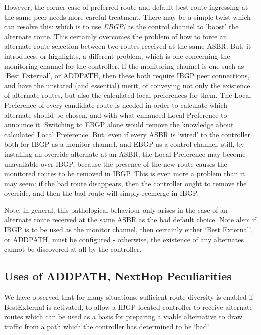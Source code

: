 However, the corner case of preferred route and default best route ingressing
at the same peer needs more careful treatment.
There may be a simple twist
which can resolve this: which is to use \emph{EBGP|} as the control channel to
'boost' the alternate route.
This certainly overcomes the problem of how to
force an alternate route selection between two routes received at the same
ASBR.
But, it introduces, or highlights, a different problem, which is one concerning the monitoring channel for the controller.
If the monitoring channel is one such as `Best External', or ADDPATH, then these both
require IBGP peer connections, and have the unstated (and essential) merit, of
conveying not only the existence of alternate routes, but also the calculated
local preferences for them.
The Local Preference of every candidate route is needed in order to calculate
which alternate should be chosen, and with what enhanced Local Preference to
announce it.  Switching to EBGP alone would remove the knowledge about
calculated Local Preference.  But, even if every ASBR is `wired' to the
controller both for IBGP as a monitor channel, and EBGP as a control channel,
still, by installing an override alternate at an ASBR, the Local Preference may
become unavailable over IBGP, because the presence of the new route causes the
monitored routes to be removed in IBGP.  This is even more a problem than it
may seem: if the bad route disappears, then the controller ought to remove the
override, and then the bad route will simply reemerge in IBGP.

Note: in general, this pathological behaviour only arises in the case of an alternate route received at
the same ASBR as the bad default choice.
Note also: if IBGP is to be used as the monitor channel, then certainly either `Best External', or ADDPATH, must be configured - otherwise, the existence of any alternates cannot be discovered at all by the controller.
\subsection{Uses of ADDPATH, NextHop Peculiarities}
We have  observed that for many situations, sufficient route diversity is enabled if BestExternal is activated, to allow a IBGP located controller to receive alternate routes which can be used as a basis for preparing a viable alternative to draw traffic from a path which the controller has determined to be `bad'.

